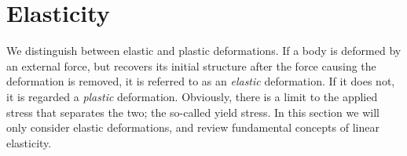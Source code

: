 \documentclass[twoside,english]{uiofysmaster}
\begin{document}










\section{Elasticity}


We distinguish between elastic and plastic deformations.
If a body is deformed by an external force, but recovers its initial structure after the force causing the deformation is removed, it is referred to as an \textit{elastic} deformation. 
If it does not, it is regarded a \textit{plastic} deformation. 
Obviously, there is a limit to the applied stress that separates the two;  the so-called yield stress. 
In this section we will only consider elastic deformations, and review fundamental concepts of linear elasticity. 
\end{document}
